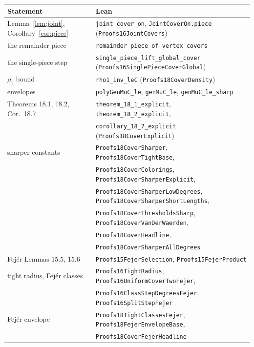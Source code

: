 \documentclass[11pt]{article}
\theoremstyle{definition}
\theoremstyle{remark}
\newcommand{\lean}[1]{\texttt{#1}}
\begin{document}
\begin{center}\footnotesize
\begin{tabular}{>{\raggedright\arraybackslash}p{}>{\raggedright\arraybackslash}p{}}
\toprule
Statement & Lean\\
\midrule
Lemma~\ref{lem:joint}, Corollary~\ref{cor:piece} & \lean{joint\_cover\_on}, \lean{JointCoverOn.piece} (\lean{Proofs16JointCovers})\\
the remainder piece & \lean{remainder\_piece\_of\_vertex\_covers}\\
the single-piece step & \lean{single\_piece\_lift\_global\_cover} (\lean{Proofs16SinglePieceCoverGlobal})\\
$\rho_1$ bound & \lean{rho1\_inv\_leC} (\lean{Proofs18CoverDensity})\\
envelopes & \lean{polyGenMuC\_le}, \lean{genMuC\_le}, \lean{genMuC\_le\_sharp}\\
Theorems 18.1, 18.2, Cor.~18.7 & \lean{theorem\_18\_1\_explicit}, \lean{theorem\_18\_2\_explicit},\\
& \lean{corollary\_18\_7\_explicit} (\lean{Proofs18CoverExplicit})\\
sharper constants & \lean{Proofs18CoverSharper}, \lean{Proofs18CoverTightBase},\\
& \lean{Proofs18CoverColorings}, \lean{Proofs18CoverSharperExplicit},\\
& \lean{Proofs18CoverSharperLowDegrees}, \lean{Proofs18CoverSharperShortLengths},\\
& \lean{Proofs18CoverThresholdsSharp}, \lean{Proofs18CoverVanDerWaerden},\\
& \lean{Proofs18CoverHeadline},\\
& \lean{Proofs18CoverSharperAllDegrees}\\
Fej\'er Lemmas 15.5, 15.6 & \lean{Proofs15FejerSelection}, \lean{Proofs15FejerProduct}\\
tight radius, Fej\'er classes & \lean{Proofs16TightRadius}, \lean{Proofs16UniformCoverTwoFejer},\\
& \lean{Proofs16ClassStepDegreesFejer}, \lean{Proofs16SplitStepFejer}\\
Fej\'er envelope & \lean{Proofs18TightClassesFejer}, \lean{Proofs18FejerEnvelopeBase},\\
& \lean{Proofs18CoverFejerHeadline}\\
\bottomrule
\end{tabular}
\end{center}
\end{document}
